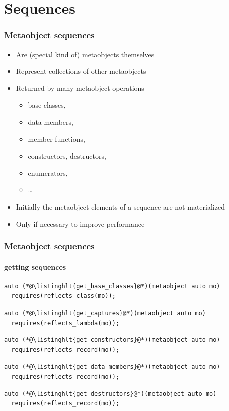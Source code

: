 \documentclass[aspectratio=169,compress,table,xcolor=table]{beamer}
\begin{document}
\section{Sequences}
\begin{frame}
  \frametitle{Metaobject sequences}
  \larger
  \begin{itemize}
    \item Are (special kind of) metaobjects themselves
    \item Represent collections of other metaobjects
    \item Returned by many metaobject operations
    \begin{itemize}
      \smaller
      \item base classes,
      \item data members,
      \item member functions,
      \item constructors, destructors,
      \item enumerators,
      \item \ldots
    \end{itemize}
    \item Initially the metaobject elements of a sequence are not materialized
    \item Only  if necessary to improve performance
  \end{itemize}
\end{frame}
\begin{frame}[fragile]
  \frametitle{Metaobject sequences}
  \framesubtitle{getting sequences}
  \begin{lstlisting}[language=c++2x,basicstyle=\small\ttfamily]
auto (*@\listinghlt{get_base_classes}@*)(metaobject auto mo)
  requires(reflects_class(mo));
  \end{lstlisting}
  \vfill
  \begin{lstlisting}[language=c++2x,basicstyle=\small\ttfamily]
auto (*@\listinghlt{get_captures}@*)(metaobject auto mo)
  requires(reflects_lambda(mo));
  \end{lstlisting}
  \vfill
  \begin{lstlisting}[language=c++2x,basicstyle=\small\ttfamily]
auto (*@\listinghlt{get_constructors}@*)(metaobject auto mo)
  requires(reflects_record(mo));
  \end{lstlisting}
  \vfill
  \begin{lstlisting}[language=c++2x,basicstyle=\small\ttfamily]
auto (*@\listinghlt{get_data_members}@*)(metaobject auto mo)
  requires(reflects_record(mo));
  \end{lstlisting}
  \vfill
  \begin{lstlisting}[language=c++2x,basicstyle=\small\ttfamily]
auto (*@\listinghlt{get_destructors}@*)(metaobject auto mo)
  requires(reflects_record(mo));
  \end{lstlisting}
\end{frame}
\end{document}

